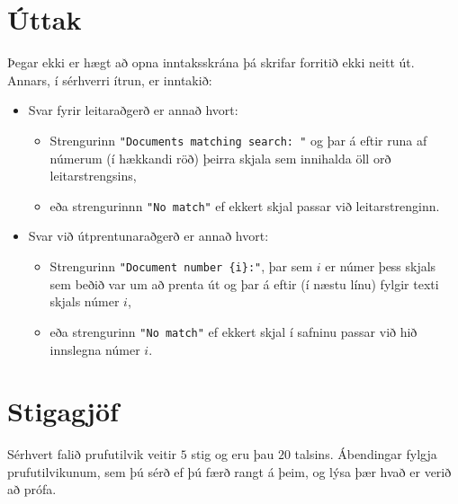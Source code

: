 \section*{Úttak}
Þegar ekki er hægt að opna inntaksskrána þá skrifar forritið ekki neitt út.
Annars, í sérhverri ítrun, er inntakið: 
\begin{itemize}
    \item Svar fyrir leitaraðgerð er annað hvort:
    \begin{itemize}
        \item Strengurinn \texttt{"Documents matching search: "} og þar á eftir runa af númerum (í hækkandi röð) þeirra skjala sem innihalda öll orð leitarstrengsins,
        \item eða strengurinnn \texttt{"No match"} ef ekkert skjal passar við leitarstrenginn.  
    \end{itemize}
    \item Svar við útprentunaraðgerð er annað hvort: 
    \begin{itemize}
        \item Strengurinn \texttt{"Document number \{i\}:"}, þar sem $i$ er númer þess skjals sem beðið var um að prenta út og þar á eftir (í næstu línu) fylgir texti skjals númer $i$, 
        \item eða strengurinn \texttt{"No match"} ef ekkert skjal í safninu passar við hið innslegna númer $i$.
    \end{itemize}
\end{itemize}

\section*{Stigagjöf}
Sérhvert falið prufutilvik veitir $5$ stig og eru þau $20$ talsins.
Ábendingar fylgja prufutilvikunum, sem þú sérð ef þú færð rangt á þeim, og lýsa þær hvað er verið að prófa.
